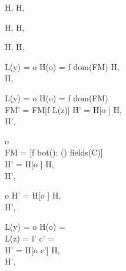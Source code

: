 \begin{figure}
  {H,  \; \FRedTo \; H, }

  \RuleSpace{}

  {H,  \; \FRedTo \; H, }

  \RuleSpace{}

  {H,  \; \FRedTo \; H, }

  \RuleSpace{}

  {L(y) = o \andalso H(o) =  \andalso f \in dom(FM)}
  {H,  \; \FRedTo  \\ 
  H, }

  \RuleSpace{}

  {L(y) = o \andalso H(o) =  \andalso f \in dom(FM) \\
  FM' = FM[f \mapsto L(z)] \andalso H' = H[o \mapsto {}]}
  {H,  \; \FRedTo \\
   H', }

  \RuleSpace{}

  {o \\
  FM = [f \mapsto bot(\sigma): () \in fields(C)] \\
  H' = H[o \mapsto {}]}
  {H,  \; \FRedTo \\
  H', }
  
  \RuleSpace{}

  {o \andalso
  H' = H[o \mapsto \Cell{\emptyset, \bot_{\LatVals{}}}]}
  {H,  \; \FRedTo \\
  H', }

  \RuleSpace{}
  
  {L(y) = o \andalso H(o) =  \\
  L(z) = l' \andalso c' =  \\
  H' = H[o \mapsto c']}
  {H,  \; \FRedTo \\
  H', }

  \RuleSpace{}


\end{figure}
